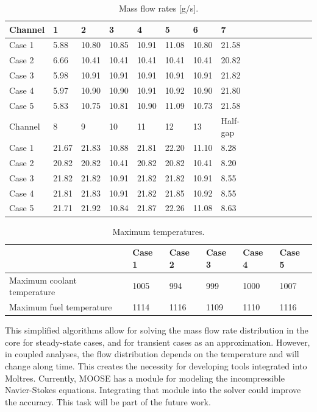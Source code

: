 \begin{table}[htbp!]
  \centering
  \caption{Mass flow rates [g/s].}
  \label{tab:th-assem-flow-massflow}
  \begin{tabular}{l|llllllllllllll}
\toprule
Channel & 1 & 2 & 3 & 4 & 5 & 6 & 7 \\
\midrule
Case 1  & 5.88 & 10.80 & 10.85 & 10.91 & 11.08 & 10.80 & 21.58 \\
Case 2  & 6.66 & 10.41 & 10.41 & 10.41 & 10.41 & 10.41 & 20.82 \\
Case 3  & 5.98 & 10.91 & 10.91 & 10.91 & 10.91 & 10.91 & 21.82 \\
Case 4  & 5.97 & 10.90 & 10.90 & 10.91 & 10.92 & 10.90 & 21.80 \\
Case 5  & 5.83 & 10.75 & 10.81 & 10.90 & 11.09 & 10.73 & 21.58 \\
\midrule
Channel & 8 & 9 & 10 & 11 & 12 & 13 & Half-gap \\
\midrule
Case 1  & 21.67 & 21.83 & 10.88 & 21.81 & 22.20 & 11.10 & 8.28 \\
Case 2  & 20.82 & 20.82 & 10.41 & 20.82 & 20.82 & 10.41 & 8.20 \\
Case 3  & 21.82 & 21.82 & 10.91 & 21.82 & 21.82 & 10.91 & 8.55 \\
Case 4  & 21.81 & 21.83 & 10.91 & 21.82 & 21.85 & 10.92 & 8.55 \\
Case 5  & 21.71 & 21.92 & 10.84 & 21.87 & 22.26 & 11.08 & 8.63 \\
\bottomrule
\end{tabular}
\end{table}

\begin{table}[htbp!]
  \centering
  \caption{Maximum temperatures.}
  \label{tab:th-assem-flow-results}
\begin{tabular}{l|lllll}
\toprule
                            & Case 1 & Case 2 & Case 3 & Case 4 & Case 5 \\
\midrule
Maximum coolant temperature & 1005   &  994   &  999 & 1000 & 1007 \\
Maximum fuel temperature    & 1114   & 1116   & 1109 & 1110 & 1116 \\
\bottomrule
\end{tabular}
\end{table}

This simplified algorithms allow for solving the mass flow rate distribution in the core for steady-state cases, and for transient cases as an approximation.
However, in coupled analyses, the flow distribution depends on the temperature and will change along time.
This creates the necessity for developing tools integrated into Moltres.
Currently, MOOSE has a module for modeling the incompressible Navier-Stokes equations.
Integrating that module into the solver could improve the accuracy.
This task will be part of the future work.

